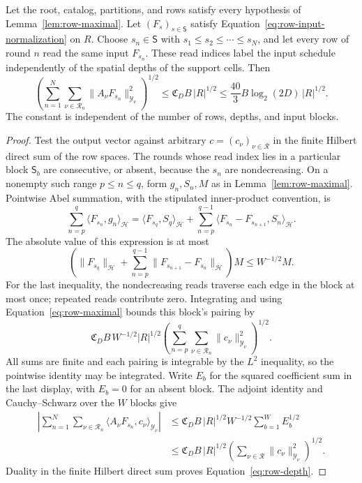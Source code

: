 \begin{lemma}
\label{lem:row-depth}
Let the root, catalog, partitions, and rows satisfy every hypothesis
of Lemma~\ref{lem:row-maximal}.  Let $(F_s)_{s\in\mathsf S}$ satisfy
Equation~\eqref{eq:row-input-normalization} on $R$.  Choose
$s_n\in\mathsf S$ with
$s_1\le s_2\le\cdots\le s_N$, and let every row of round $n$
read the same input $F_{s_n}$.  These read indices label the input
schedule independently of the spatial depths of the support cells.  Then
\begin{equation}
 \left(\sum_{n=1}^N\sum_{\nu\in\mathcal R_n}
          \|A_\nu F_{s_n}\|_{\mathcal Y_\nu}^2\right)^{1/2}
 \le \mathfrak C_D B\,|R|^{1/2}
 \le \frac{40}{3} B\log_2(2D)\,|R|^{1/2}.
 \label{eq:row-depth}
\end{equation}
The constant is independent of the number of rows, depths, and
input blocks.
\end{lemma}

\begin{proof}
Test the output vector against arbitrary
$c=(c_\nu)_{\nu\in\mathcal R}$ in the finite Hilbert direct sum of
the row spaces.  The rounds whose read index lies in a particular
block $\mathsf S_b$ are consecutive, or absent, because the
$s_n$ are nondecreasing.  On a nonempty such range $p\le n\le q$,
form $g_n,S_n,M$ as in Lemma~\ref{lem:row-maximal}.  Pointwise Abel
summation, with the stipulated inner-product convention, is
\[
 \sum_{n=p}^q\langle F_{s_n},g_n\rangle_{\mathcal H}
 =\langle F_{s_q},S_q\rangle_{\mathcal H}
   +\sum_{n=p}^{q-1}
       \langle F_{s_n}-F_{s_{n+1}},S_n\rangle_{\mathcal H}.
\]
The absolute value of this expression is at most
\[
 \left(\|F_{s_q}\|_{\mathcal H}
       +\sum_{n=p}^{q-1}\|F_{s_{n+1}}-F_{s_n}\|_{\mathcal H}\right)M
 \le W^{-1/2}M.
\]
For the last inequality, the nondecreasing reads traverse each
edge in the block at most once; repeated reads contribute zero.
Integrating and using Equation~\eqref{eq:row-maximal} bounds this
block's pairing by
\[
 \mathfrak C_D B\,W^{-1/2}|R|^{1/2}
       \left(\sum_{n=p}^q\sum_{\nu\in\mathcal R_n}
                         \|c_\nu\|_{\mathcal Y_\nu}^2\right)^{1/2}.
\]
All sums are finite and each pairing is integrable by the $L^2$
inequality, so the pointwise identity may be integrated.  Write
$E_b$ for the squared coefficient sum in the last display, with
$E_b=0$ for an absent block.  The adjoint identity and
Cauchy--Schwarz over the $W$ blocks give
\[
 \begin{split}
 \left|\sum_{n=1}^N\sum_{\nu\in\mathcal R_n}
              \langle A_\nu F_{s_n},c_\nu\rangle_{\mathcal Y_\nu}\right|
 &\le \mathfrak C_D B\,|R|^{1/2}
                  W^{-1/2}\sum_{b=1}^W E_b^{1/2}\\
 &\le \mathfrak C_D B\,|R|^{1/2}
        \left(\sum_{\nu\in\mathcal R}\|c_\nu\|_{\mathcal Y_\nu}^2\right)^{1/2}.
 \end{split}
\]
Duality in the finite Hilbert direct sum proves
Equation~\eqref{eq:row-depth}.
\end{proof}

